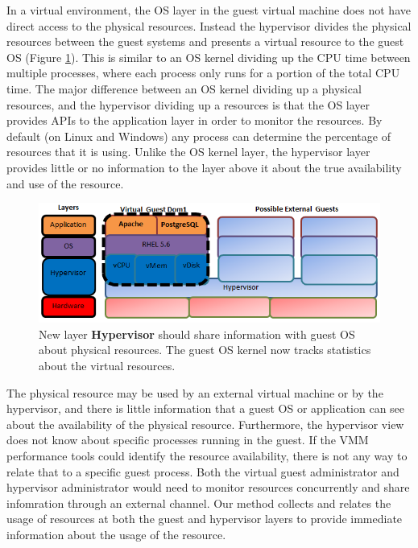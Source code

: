 In a virtual environment, the OS layer in the guest virtual machine does not have direct access to the physical resources.  Instead the hypervisor divides the physical resources between the guest systems and presents a virtual resource to the guest OS (Figure \ref{LayersAndResources}).
This is similar to an OS kernel dividing up the CPU time between multiple processes, where each process only runs for a portion of the total CPU time.  
The major difference between an OS kernel dividing up a physical resources, and the hypervisor dividing up a resources is that the OS layer provides APIs to the application layer in order to monitor the resources.  By default (on Linux and Windows) any process can determine the percentage of resources that it is using.  Unlike the OS kernel layer, the hypervisor layer provides little or no information to the layer above it about the true availability and use of the resource. 

\begin{figure}[!h]
  \begin{center}
  \includegraphics[width=6in]{images/LayersVirtual.png}
  \caption{New layer \textbf{Hypervisor} should share information with guest OS about physical resources.  The guest OS kernel now tracks statistics about the virtual resources.}
  \label{LayersAndResources}
  \end{center}
\end{figure}

The physical resource may be used by an external virtual machine or by the hypervisor, and there is little information that a guest OS or application can see about the availability of the physical resource.
Furthermore, the hypervisor view does not know about specific processes running in the guest.  If the VMM performance tools could identify the resource availability, there is not any way to relate that to a specific guest process.  Both the virtual guest administrator and hypervisor administrator would need to monitor resources concurrently and share infomration through an external channel.  Our method collects and relates the usage of resources at both the guest and hypervisor layers to provide immediate information about the usage of the resource.

